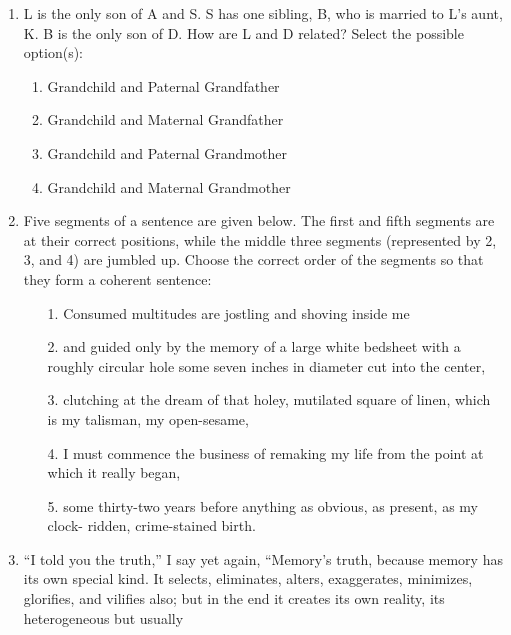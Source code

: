 \documentclass[12pt]{article}
\theoremstyle{remark}
\begin{document}
\begin{enumerate}
\item L is the only son of A and S. S has one sibling, B, who is married to L's aunt, K.
B is the only son of D. How are L and D related?
Select the possible option(s): 
\begin{enumerate}
\item Grandchild and Paternal Grandfather 
\item Grandchild and Maternal Grandfather 
\item Grandchild and Paternal Grandmother 
\item Grandchild and Maternal Grandmother 
\end{enumerate}
\hfill{}
\item Five segments of a sentence are given below. The first and fifth segments are at
their correct positions, while the middle three segments (represented by 2, 3, and 4)
are jumbled up. Choose the correct order of the segments so that they form a
coherent sentence: 
\begin{enumerate}
\item[1.] Consumed multitudes are jostling and shoving inside me 
\item[2.] and guided only by the memory of a large white bedsheet with a roughly
circular hole some seven inches in diameter cut into the center, 
\item[3.] clutching at the dream of that holey, mutilated square of linen, which is my
talisman, my open-sesame, 
\item[4.] I must commence the business of remaking my life from the point at which
it really began, 
\item[5.] some thirty-two years before anything as obvious, as present, as my clock-
ridden, crime-stained birth. 
\end{enumerate}
\begin{enumerate}  \end{enumerate}
\hfill{}
\item “I told you the truth,” I say yet again, “Memory’s truth, because memory has its
own special kind. It selects, eliminates, alters, exaggerates, minimizes, glorifies, and
vilifies also; but in the end it creates its own reality, its heterogeneous but usually

\end{enumerate}
\end{document}
